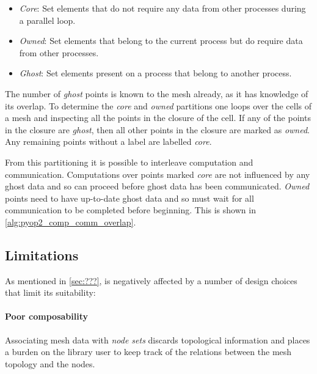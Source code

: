 \documentclass[thesis]{subfiles}
\begin{document}
\begin{itemize}
  \item \textit{Core}: Set elements that do not require any data from other processes during a parallel loop.

  \item \textit{Owned}: Set elements that belong to the current process but do require data from other processes.

  \item \textit{Ghost}: Set elements present on a process that belong to another process.
\end{itemize}


The number of \textit{ghost} points is known to the mesh already, as it has knowledge of its overlap.
To determine the \textit{core} and \textit{owned} partitions one loops over the cells of a mesh and inspecting all the points in the closure of the cell.
If any of the points in the closure are \textit{ghost}, then all other points in the closure are marked as \textit{owned}.
Any remaining points without a label are labelled \textit{core}.

From this partitioning it is possible to interleave computation and communication.
Computations over points marked \textit{core} are not influenced by any ghost data and so can proceed before ghost data has been communicated. \textit{Owned} points need to have up-to-date ghost data and so must wait for all communication to be completed before beginning.
This is shown in \cref{alg:pyop2_comp_comm_overlap}.

\subsection{Limitations}

As mentioned in \cref{sec:???},  is negatively affected by a number of design choices that limit its suitability:

\paragraph{Poor composability}{
  Associating mesh data with \textit{node sets} discards topological information and places a burden on the library user to keep track of the relations between the mesh topology and the nodes.
}
\end{document}
